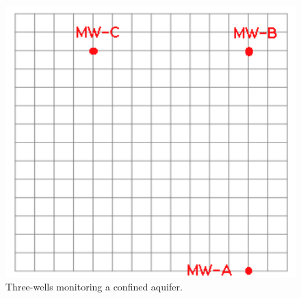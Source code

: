 \documentclass[12pt]{article}
\begin{document}
\begin{enumerate}
\begin{enumerate}
\begin{figure}[h!] %
   \centering
   \includegraphics[width=6in]{grid-paper.pdf} 
   \caption{Three-wells monitoring a confined aquifer.}
   \label{fig:grid-paper.pdf}
\end{figure}
\clearpage



\end{enumerate}
\end{enumerate}
\end{document}
